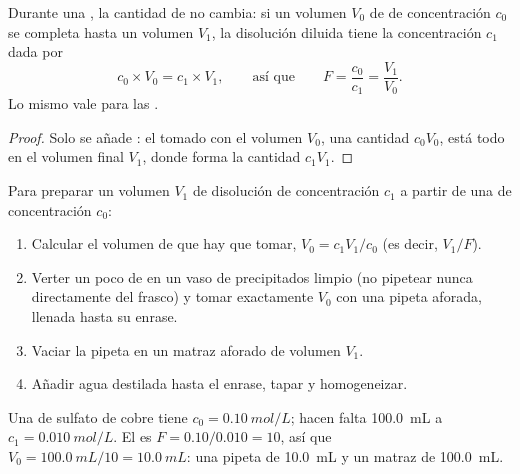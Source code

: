 \begin{proposition}\label{prop:g10:concentration-and-dilution:kept}
Durante una , la cantidad de  no cambia: si un volumen
$V_0$ de  de concentración $c_0$ se completa hasta un
volumen $V_1$, la disolución diluida tiene la concentración $c_1$ dada
por
\[
  c_0 \times V_0 = c_1 \times V_1,
  \qquad\text{así que}\qquad
  F = \frac{c_0}{c_1} = \frac{V_1}{V_0} .
\]
Lo mismo vale para las .
\end{proposition}

\begin{proof}
Solo se añade : el  tomado con el volumen $V_0$, una
cantidad $c_0 V_0$, está todo en el volumen final $V_1$, donde forma la
cantidad $c_1 V_1$.
\end{proof}


\begin{method}\label{met:g10:concentration-and-dilution:diluting}
Para preparar un volumen $V_1$ de disolución de concentración $c_1$ a
partir de una  de concentración $c_0$:
\begin{enumerate}
  \item Calcular el volumen de  que hay que tomar,
        $V_0 = c_1 V_1 / c_0$ (es decir, $V_1 / F$).
  \item Verter un poco de  en un vaso de precipitados
        limpio (no pipetear nunca directamente del frasco) y tomar
        exactamente $V_0$ con una pipeta aforada, llenada hasta su
        enrase.
  \item Vaciar la pipeta en un matraz aforado de volumen $V_1$.
  \item Añadir agua destilada hasta el enrase, tapar y homogeneizar.
\end{enumerate}
\end{method}

\begin{example}\label{ex:g10:concentration-and-dilution:tenfold}
Una  de sulfato de cobre tiene $c_0 = \qty{0.10}{mol/L}$;
hacen falta \qty{100.0}{mL} a $c_1 = \qty{0.010}{mol/L}$. El  es $F = 0.10 / 0.010 = 10$, así que $V_0 = \qty{100.0}{mL} / 10 =
\qty{10.0}{mL}$: una pipeta de \qty{10.0}{mL} y un matraz de
\qty{100.0}{mL}.
\end{example}

